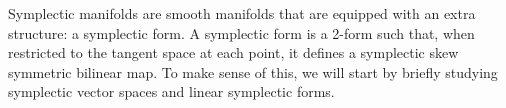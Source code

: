 Symplectic manifolds are smooth manifolds that are equipped with an extra structure: a symplectic form. A symplectic form is a 2-form such that, when restricted to the tangent space at each point, it defines a symplectic skew symmetric bilinear map. To make sense of this, we will start by briefly studying symplectic vector spaces and linear symplectic forms. \\


